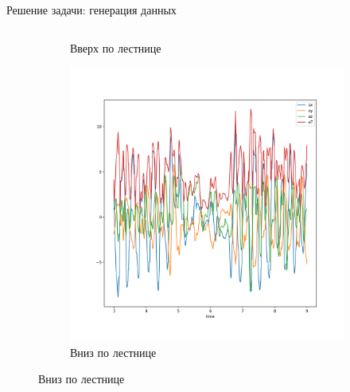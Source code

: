 \documentclass{beamer}
\begin{document}
\begin{frame}{Решение задачи: генерация данных}
\begin{columns}
\begin{column}{\textwidth}
\begin{figure}
\begin{subfigure}[b]{0.25\textwidth}
                    \caption{Вверх по лестнице}
                    \label{fig:sfig3}
                \end{subfigure}%
                \begin{subfigure}[b]{0.25\textwidth}
                    \centering
                    \includegraphics[width=\linewidth]{../pics/raw_go_down.png}
                    \caption{Вниз по лестнице}
                    \label{fig:sfig4}
                \end{subfigure}
                \label{fig:fig}
            \end{figure}
        \end{column}%
    \end{columns}
\end{frame}
\end{document}
